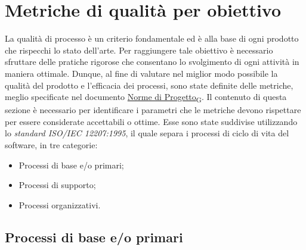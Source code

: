 \section{Metriche di qualità per obiettivo}
La qualità di processo è un criterio fondamentale ed è alla base di ogni prodotto che rispecchi lo stato dell'arte. Per raggiungere tale obiettivo è necessario sfruttare delle pratiche rigorose che consentano lo svolgimento di ogni attività in maniera ottimale. Dunque, al fine di valutare nel miglior modo possibile la qualità del prodotto e l'efficacia dei processi, sono state definite delle metriche, meglio specificate nel documento \href{https://7last.github.io/docs/rtb/documentazione-interna/glossario#norme-di-progetto}{Norme di Progetto\textsubscript{G}}. Il contenuto di questa sezione è necessario per identificare i parametri che le metriche devono rispettare per essere considerate accettabili o ottime. Esse sono state suddivise utilizzando lo \textit{standard ISO/IEC 12207:1995}, il quale separa i processi di ciclo di vita del software, in tre categorie: 
\begin{itemize}
	\item Processi di base e/o primari;
	\item Processi di supporto;
	\item Processi organizzativi.
\end{itemize}

\subsection{Processi di base e/o primari}
